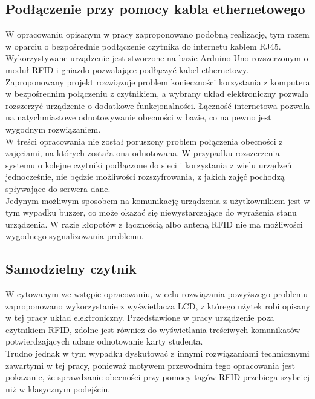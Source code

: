 \documentclass[declaration,shortabstract, mgr]{iithesis}
\begin{document}
\subsection{Podłączenie przy pomocy kabla ethernetowego}
\indent W opracowaniu opisanym w pracy\cite{ethernet} zaproponowano podobną realizację, tym razem w oparciu o bezpośrednie podłączenie czytnika do internetu kablem RJ45. Wykorzystywane urządzenie jest stworzone na bazie Arduino Uno rozszerzonym o moduł RFID i gniazdo pozwalające podłączyć kabel ethernetowy. \\
\indent Zaproponowany projekt rozwiązuje problem konieczności korzystania z komputera w bezpośrednim połączeniu z czytnikiem, a wybrany układ elektroniczny pozwala rozszerzyć urządzenie o dodatkowe funkcjonalności. Łączność internetowa pozwala na natychmiastowe odnotowywanie obecności w bazie, co na pewno jest wygodnym rozwiązaniem. \\
\indent W treści opracowania nie został poruszony problem połączenia obecności z zajęciami, na których została ona odnotowana. W przypadku rozszerzenia systemu o kolejne czytniki podłączone do sieci i korzystania z wielu urządzeń jednocześnie, nie będzie możliwości rozszyfrowania, z jakich zajęć pochodzą spływające do serwera dane. \\
\indent Jedynym możliwym sposobem na komunikację urządzenia z użytkownikiem jest w tym wypadku buzzer, co może okazać się niewystarczające do wyrażenia stanu urządzenia. W razie kłopotów z łącznością albo anteną RFID nie ma możliwości wygodnego sygnalizowania problemu.

\subsection{Samodzielny czytnik }
\indent W cytowanym we wstępie opracowaniu\cite{lcd}, w celu rozwiązania powyższego problemu zaproponowano wykorzystanie z wyświetlacza LCD, z którego użytek robi opisany w tej pracy układ elektroniczny. Przedstawione w pracy urządzenie poza czytnikiem RFID, zdolne jest również do wyświetlania treściwych komunikatów potwierdzających udane odnotowanie karty studenta. \\
\indent Trudno jednak w tym wypadku dyskutować z innymi rozwiązaniami technicznymi zawartymi w tej pracy, ponieważ motywem przewodnim tego opracowania jest pokazanie, że sprawdzanie obecności przy pomocy tagów RFID przebiega szybciej niż w klasycznym podejściu.
\end{document}
